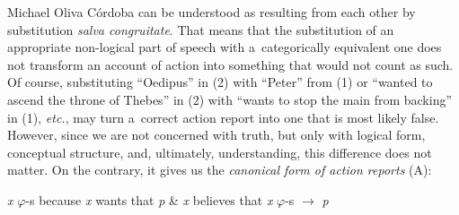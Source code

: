\begin{artengenv}{Michael Oliva Córdoba}
\noindent can be understood as resulting from each other by substitution \textit{salva congruitate}. That means that the substitution of an appropriate non-logical part of speech with a~categorically equivalent one does not transform an account of action into something that would not count as such. Of course, substituting ``Oedipus'' in (2) with ``Peter'' from (1) or ``wanted to ascend the throne of Thebes'' in (2) with ``wants to stop the main from backing'' in (1), \textit{etc.}, may turn a~correct action report into one that is most likely false. However, since we are not concerned with truth, but only with logical form, conceptual structure, and, ultimately, understanding, this difference does not matter. On the contrary, it gives us the \textit{canonical form of action reports} (A):
\vspace{-.07cm}
\begin{description}[font=\normalfont, labelindent=0pt, leftmargin=!, labelwidth=1cm]
  \item[(A)] \textit{x} $\varphi$-s because \textit{x} wants that \textit{p} \& \textit{x} believes that \textit{x} $\varphi$-s $\to$ \textit{p}
\end{description}
%
%


\end{artengenv}
